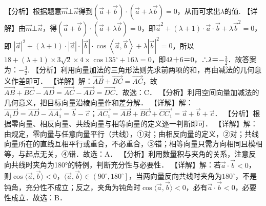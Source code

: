 【分析】根据题意\(\overrightarrow{m}\bot\overrightarrow{n}\)得到\(\left( \overrightarrow{a} + \overrightarrow{b} \right) \cdot \allowbreak\left( \overrightarrow{a} + \lambda\overrightarrow{b} \right) = 0\)，从而可求出\(\lambda\)的值.
【详解】由\(\overrightarrow{m}\bot\overrightarrow{n}\)，得\(\left( \overrightarrow{a} + \overrightarrow{b} \right) \cdot \allowbreak\left( \overrightarrow{a} + \lambda\overrightarrow{b} \right) = 0\)，即\({\overrightarrow{a}}^{2} + (\lambda + 1) \cdot \overrightarrow{a} \cdot \overrightarrow{b} + \lambda{\overrightarrow{b}}^{2} = 0\)，即
\(\left| \overrightarrow{a} \right|^{2} + (\lambda + 1) \cdot \allowbreak\left| \overrightarrow{a} \right| \cdot \allowbreak\left| \overrightarrow{b} \right| \cdot \cos\left\langle \overrightarrow{a},\overrightarrow{b} \right\rangle + \lambda\left| \overrightarrow{b} \right|^{2} = 0\)，所以\(18 + (\lambda + 1) \times 3\sqrt{2} \times 4 \times \cos 135{^\circ} + 16\lambda = 0\)，即4\emph{λ}＋6＝0，∴\emph{λ}＝\(- \frac{3}{2}\)．故答案为：\(- \frac{3}{2}\).
【分析】利用向量加法的三角形法则先求前两项的和，再由减法的几何意义作差即可．
【详解】解：\(\overrightarrow{AB} + \overrightarrow{BC} = \overrightarrow{AC}\)，故\(\overrightarrow{AB} + \overrightarrow{BC} - \overrightarrow{AD} = \overrightarrow{AC} - \overrightarrow{AD} = \overrightarrow{DC}\)．故选：C．
【分析】利用空间向量加减法的几何意义，把目标向量沿棱向量作和差分解．
【详解】解：\(\overrightarrow{A_{1}D} = \overrightarrow{AD} - \overrightarrow{AA_{1}} = \overrightarrow{b} - \overrightarrow{c}\)；\(\overrightarrow{AC_{1}} = \overrightarrow{AB} + \overrightarrow{BC} + \overrightarrow{CC_{1}} = \overrightarrow{a} + \overrightarrow{b} + \overrightarrow{c}\)．
【分析】根据零向量、相反向量、共线向量与相等向量的定义逐一判断即可．
【详解】解：由规定，零向量与任意向量平行（共线），①对；由相反向量的定义，②对；共线向量所在的直线互相平行或重合，不必重合，③错；相等向量只需方向相同且模相等，与起点无关，④错．故选：A．
【分析】利用数量积与夹角的关系，注意反向共线时夹角为180°的特例，判断充分性与必要性．
【详解】解：若\(\overrightarrow{a} \cdot \overrightarrow{b} < 0\)，则\(\cos\langle \overrightarrow{a},\overrightarrow{b} \rangle < 0\)，\(\langle \overrightarrow{a},\overrightarrow{b} \rangle \in \left( 90^{\circ},180^{\circ} \right]\)，当两向量反向共线时夹角为\(180^{\circ}\)，不是钝角，充分性不成立；反之，夹角为钝角时\(\cos\langle \overrightarrow{a},\overrightarrow{b} \rangle < 0\)，必有\(\overrightarrow{a} \cdot \overrightarrow{b} < 0\)，必要性成立．故选：B．
